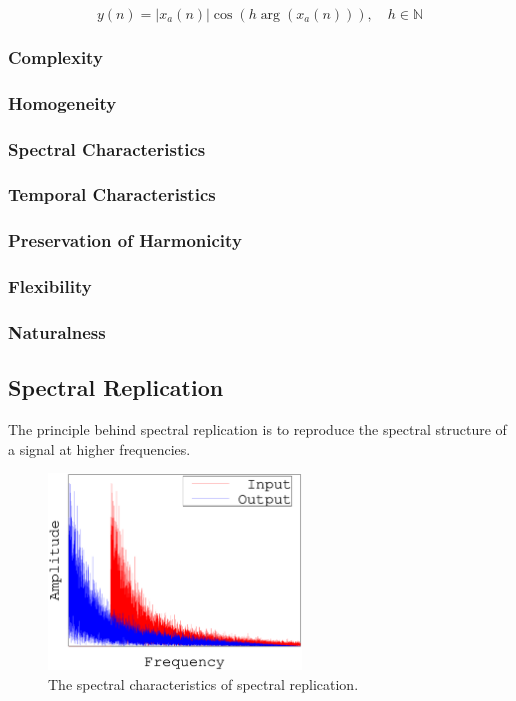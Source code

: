 		\begin{equation}
			y(n) = |x_{a}(n)| \cos \left( h\arg(x_{a}(n)) \right), \quad h \in \mathbb{N}
			\label{eq:IAP}
		\end{equation}

		\subsubsection*{Complexity}
		\subsubsection*{Homogeneity}
		\subsubsection*{Spectral Characteristics}
		\subsubsection*{Temporal Characteristics}
		\subsubsection*{Preservation of Harmonicity}
		\subsubsection*{Flexibility}
		\subsubsection*{Naturalness}

	\subsection{Spectral Replication}
	\label{sec:Excitation-SpectralReplication}
		The principle behind spectral replication is to reproduce the spectral structure of a signal at higher
		frequencies.

		\begin{figure}[h!]
			\centering
			\includegraphics[width=0.6\textwidth]{chapter3/Images/SpectralReplication.eps}
			\caption{The spectral characteristics of spectral replication.}
			\label{fig:SpectralReplication}
		\end{figure}


